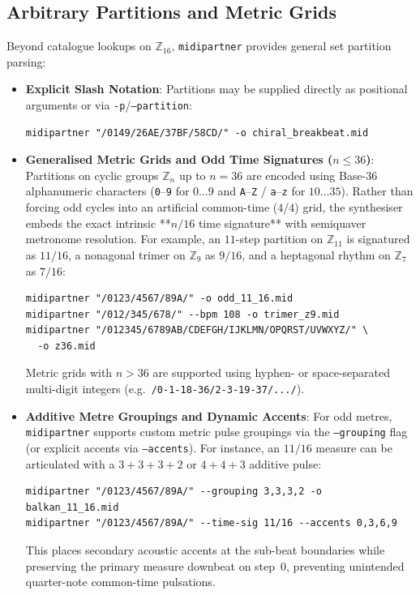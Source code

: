 \subsection{Arbitrary Partitions and Metric Grids}
Beyond catalogue lookups on $\mathbb{Z}_{16}$, \texttt{midipartner} provides general set partition parsing:
\begin{itemize}
    \item \textbf{Explicit Slash Notation}: Partitions may be supplied directly as positional arguments or via \texttt{-p}/\texttt{--partition}:
{\small
\begin{verbatim}
midipartner "/0149/26AE/37BF/58CD/" -o chiral_breakbeat.mid
\end{verbatim}}
    \item \textbf{Generalised Metric Grids and Odd Time Signatures ($n \le 36$)}:
    Partitions on cyclic groups $\mathbb{Z}_n$ up to $n=36$ are encoded using Base-36 alphanumeric characters (\texttt{0}--\texttt{9} for $0 \dots 9$ and \texttt{A}--\texttt{Z} / \texttt{a}--\texttt{z} for $10 \dots 35$). Rather than forcing odd cycles into an artificial common-time ($4/4$) grid, the synthesiser embeds the exact intrinsic **$n/16$ time signature** with semiquaver metronome resolution. For example, an $11$-step partition on $\mathbb{Z}_{11}$ is signatured as $11/16$, a nonagonal trimer on $\mathbb{Z}_9$ as $9/16$, and a heptagonal rhythm on $\mathbb{Z}_7$ as $7/16$:
{\small
\begin{verbatim}
midipartner "/0123/4567/89A/" -o odd_11_16.mid
midipartner "/012/345/678/" --bpm 108 -o trimer_z9.mid
midipartner "/012345/6789AB/CDEFGH/IJKLMN/OPQRST/UVWXYZ/" \
  -o z36.mid
\end{verbatim}}
    Metric grids with $n > 36$ are supported using hyphen- or space-separated multi-digit integers (e.g.\ \texttt{/0-1-18-36/2-3-19-37/.../}).

    \item \textbf{Additive Metre Groupings and Dynamic Accents}:
    For odd metres, \texttt{midipartner} supports custom metric pulse groupings via the \texttt{--grouping} flag (or explicit accents via \texttt{--accents}). For instance, an $11/16$ measure can be articulated with a $3+3+3+2$ or $4+4+3$ additive pulse:
{\small
\begin{verbatim}
midipartner "/0123/4567/89A/" --grouping 3,3,3,2 -o balkan_11_16.mid
midipartner "/0123/4567/89A/" --time-sig 11/16 --accents 0,3,6,9
\end{verbatim}}
    This places secondary acoustic accents at the sub-beat boundaries while preserving the primary measure downbeat on step~0, preventing unintended quarter-note common-time pulsations.
\end{itemize}

